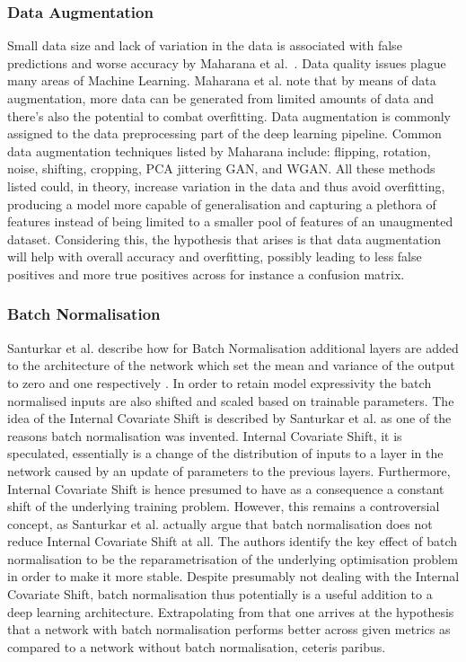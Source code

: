 \subsubsection{Data Augmentation}\label{augmentationtheory}
Small data size and lack of variation in the data is associated with false predictions and worse accuracy by Maharana et al\@.~\cite{maharana2022review}.  Data quality issues plague many areas of Machine Learning. Maharana et al\@. note that by means of data augmentation, more data can be generated from limited amounts of data and there's also the potential to combat overfitting. Data augmentation is commonly assigned to the data preprocessing part of the deep learning pipeline. Common data augmentation techniques listed by Maharana include: flipping, rotation, noise, shifting, cropping, PCA jittering GAN, and WGAN\@. All these methods listed could, in theory, increase variation in the data and thus avoid overfitting, producing a model more capable of generalisation and capturing a plethora of features instead of being limited to a smaller pool of features of an unaugmented dataset. Considering this, the hypothesis that arises is that data augmentation will help with overall accuracy and overfitting, possibly leading to less false positives and more true positives across for instance a confusion matrix.


\subsubsection{Batch Normalisation}\label{batchnormtheory}
Santurkar et al\@. describe how for Batch Normalisation additional layers are added to the architecture of the network which set the mean and variance of the output to zero and one respectively \citep{santurkar2018does}. In order to retain model expressivity the batch normalised inputs are also shifted and scaled based on trainable parameters. The idea of the Internal Covariate Shift is described by Santurkar et al\@. as one of the reasons batch normalisation was invented. Internal Covariate Shift, it is speculated, essentially is a change of the distribution of inputs to a layer in the network caused by an update of parameters to the previous layers. Furthermore, Internal Covariate Shift is hence presumed to have as a consequence a constant shift of the underlying training problem. However, this remains a controversial concept, as Santurkar et al\@. actually argue that batch normalisation does not reduce Internal Covariate Shift at all. The authors identify the key effect of batch normalisation to be the reparametrisation of the underlying optimisation problem in order to make it more stable. Despite presumably not dealing with the Internal Covariate Shift, batch normalisation thus potentially is a useful addition to a deep learning architecture. Extrapolating from that one arrives at the hypothesis that a network with batch normalisation performs better across given metrics as compared to a network without batch normalisation, ceteris paribus.



